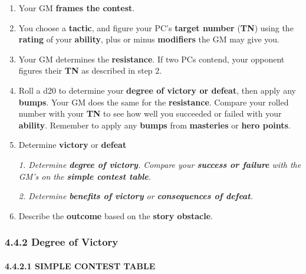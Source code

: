 \documentclass[
]{article}
\begin{document}
\begin{enumerate}
\def\labelenumi{\arabic{enumi}.}
\item
  Your GM \textbf{frames the contest}.
\item
  You choose a \textbf{tactic}, and figure your PC's \textbf{target
  number} (\textbf{TN}) using the \textbf{rating} of your
  \textbf{ability}, plus or minus \textbf{modifiers} the GM may give
  you.
\item
  Your GM determines the \textbf{resistance}. If two PCs contend, your
  opponent figures their \textbf{TN} as described in step 2.
\item
  Roll a d20 to determine your \textbf{degree of victory or defeat},
  then apply any \textbf{bumps}. Your GM does the same for the
  \textbf{resistance}. Compare your rolled number with your \textbf{TN}
  to see how well you succeeded or failed with your \textbf{ability}.
  Remember to apply any \textbf{bumps} from \textbf{masteries} or
  \textbf{hero points}.
\item
  Determine \textbf{victory} or \textbf{defeat}

  \emph{1. Determine \textbf{degree of victory}. Compare your
  \textbf{success or failure} with the GM's on the \textbf{simple
  contest table}.}

  \emph{2. Determine \textbf{benefits of victory} or
  \textbf{consequences of defeat}.}
\item
  Describe the \textbf{outcome} based on the \textbf{story obstacle}.
\end{enumerate}

\hypertarget{degree-of-victory}{%
\subsubsection{4.4.2 Degree of Victory}\label{degree-of-victory}}

\hypertarget{simple-contest-table}{%
\paragraph{4.4.2.1 SIMPLE CONTEST TABLE}\label{simple-contest-table}}
\end{document}
